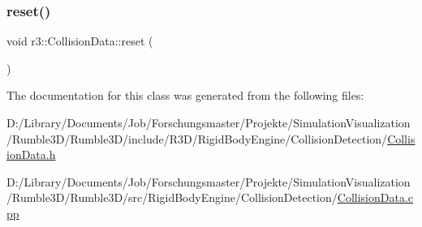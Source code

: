 \subsubsection{\texorpdfstring{reset()}{reset()}}
{\footnotesize\ttfamily void r3\+::\+Collision\+Data\+::reset (\begin{DoxyParamCaption}{ }\end{DoxyParamCaption})}



The documentation for this class was generated from the following files\+:\begin{DoxyCompactItemize}
\item 
D\+:/\+Library/\+Documents/\+Job/\+Forschungsmaster/\+Projekte/\+Simulation\+Visualization/\+Rumble3\+D/\+Rumble3\+D/include/\+R3\+D/\+Rigid\+Body\+Engine/\+Collision\+Detection/\mbox{\hyperlink{_collision_data_8h}{Collision\+Data.\+h}}\item 
D\+:/\+Library/\+Documents/\+Job/\+Forschungsmaster/\+Projekte/\+Simulation\+Visualization/\+Rumble3\+D/\+Rumble3\+D/src/\+Rigid\+Body\+Engine/\+Collision\+Detection/\mbox{\hyperlink{_collision_data_8cpp}{Collision\+Data.\+cpp}}\end{DoxyCompactItemize}
